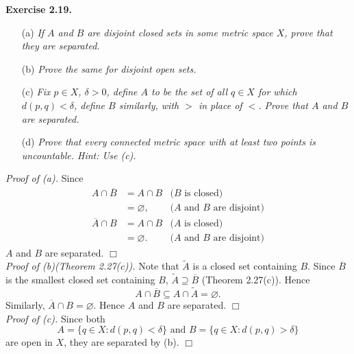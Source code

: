 \documentclass{article}
\begin{document}
\textbf{Exercise 2.19.}
\begin{enumerate}
\item[(a)]
\emph{If $A$ and $B$ are disjoint closed sets in some metric space $X$,
prove that they are separated.}
\item[(b)]
\emph{Prove the same for disjoint open sets.}
\item[(c)]
\emph{Fix $p \in X$, $\delta > 0$,
define $A$ to be the set of all $q \in X$ for which $d(p,q) < \delta$,
define $B$ similarly, with $>$ in place of $<$.
Prove that $A$ and $B$ are separated.}
\item[(d)]
\emph{Prove that every connected metric space with at least two points
is uncountable.  Hint: Use (c).} \\
\end{enumerate}

\emph{Proof of (a).}
Since
\begin{align*}
A \cap \overline{B}
&= A \cap B
  &\text{($B$ is closed)} \\
&= \varnothing,
  &\text{($A$ and $B$ are disjoint)} \\
\overline{A} \cap B
&= A \cap B
  &\text{($A$ is closed)} \\
&= \varnothing.
  &\text{($A$ and $B$ are disjoint)}
\end{align*}
$A$ and $B$ are separated.
$\Box$ \\

\emph{Proof of (b)(Theorem 2.27(c)).}
Note that $\widetilde{A}$ is a closed set containing $B$.
Since $\overline{B}$ is the smallest closed set containing $B$,
$\widetilde{A} \supseteq \overline{B}$ (Theorem 2.27(c)).
Hence $$A \cap \overline{B} \subseteq A \cap \widetilde{A} = \varnothing.$$
Similarly, $\overline{A} \cap B = \varnothing$.
Hence $A$ and $B$ are separated.
$\Box$ \\

\emph{Proof of (c).}
Since both
$$A = \{ q \in X : d(p,q) < \delta \} \text{ and } B = \{ q \in X : d(p,q) > \delta \}$$
are open in $X$, they are separated by (b).
$\Box$ \\
\end{document}
